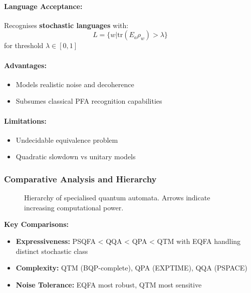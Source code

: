\paragraph{Language Acceptance:}
Recognises \textbf{stochastic languages} with:
\[
L = \{w | \text{tr}(E_a \rho_w) > \lambda\}
\]
for threshold $\lambda \in [0,1]$ \cite{hirvensalo2012quantum}

\paragraph{Advantages:}
\begin{itemize}
    \item Models realistic noise and decoherence
    \item Subsumes classical PFA recognition capabilities
\end{itemize}

\paragraph{Limitations:}
\begin{itemize}
    \item Undecidable equivalence problem
    \item Quadratic slowdown vs unitary models
\end{itemize}

\subsubsection*{Comparative Analysis and Hierarchy}
\begin{figure}[h]
\centering
{}
\caption{Hierarchy of specialised quantum automata. Arrows indicate increasing computational power.}
\label{fig:specialised-hierarchy}
\end{figure}

\textbf{Key Comparisons:}
\begin{itemize}
    \item \textbf{Expressiveness:} PSQFA < QQA < QPA < QTM with EQFA handling distinct stochastic class
    \item \textbf{Complexity:} QTM (BQP-complete), QPA (EXPTIME), QQA (PSPACE)
    \item \textbf{Noise Tolerance:} EQFA most robust, QTM most sensitive
\end{itemize}
